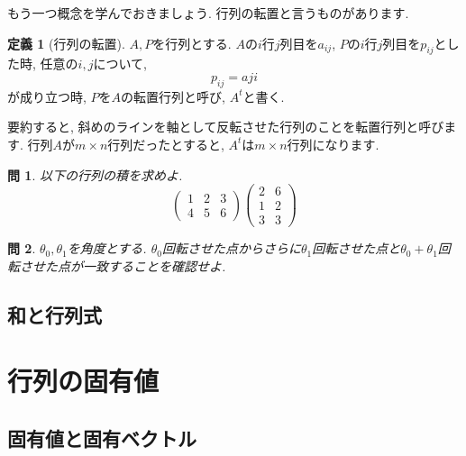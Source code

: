 \documentclass[a4paper,12pt]{jreport}
\newtheorem{problem}{問}[chapter]
\theoremstyle{definition}
\newtheorem{defi}{定義}
\begin{document}
   もう一つ概念を学んでおきましょう.
   行列の転置と言うものがあります.
   \begin{defi}[行列の転置]
      $A,P$を行列とする.
      $A$の$i$行$j$列目を$a_{ij}$, $P$の$i$行$j$列目を$p_{ij}$とした時,
      任意の$i,j$について,
      $$
      p_{ij}=a{ji}
      $$
      が成り立つ時, $P$を$A$の転置行列と呼び, $A^t$と書く.
   \end{defi}
   要約すると, 斜めのラインを軸として反転させた行列のことを転置行列と呼びます.
   行列$A$が$m\times n$行列だったとすると, $A^t$は$m\times n$行列になります.

   \begin{problem}
      以下の行列の積を求めよ.
      $$
      \begin{pmatrix}
         1 & 2 & 3\\
         4 & 5 & 6
      \end{pmatrix}
      \begin{pmatrix}
         2 & 6\\
         1 & 2\\
         3 & 3
      \end{pmatrix}
      $$
   \end{problem}
   \begin{problem}
      $\theta_0, \theta_1$を角度とする.
      $\theta_0$回転させた点からさらに$\theta_1$回転させた点と$\theta_0+\theta_1$回転させた点が一致することを確認せよ.
   \end{problem}

   \newpage

   \section{和と行列式}

   \chapter{行列の固有値}
   \section{固有値と固有ベクトル}
\end{document}
